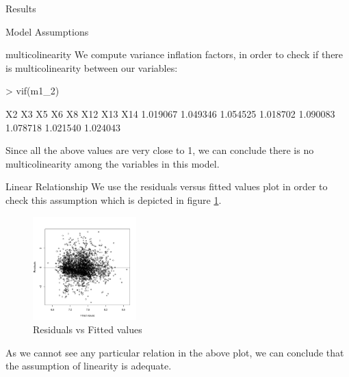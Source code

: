 \documentclass[a4paper,11pt]{article}
\begin{document}
\begin{section}{Results}
\begin{subsection}{Model Assumptions}
\begin{subsubsection}{multicolinearity}
We compute variance inflation factors, in order to check if there is multicolinearity between our variables:
\begin{Schunk}
\begin{Sinput}
> vif(m1_2)
\end{Sinput}
\begin{Soutput}
      X2       X3       X5       X6       X8      X12      X13      X14 
1.019067 1.049346 1.054525 1.018702 1.090083 1.078718 1.021540 1.024043 
\end{Soutput}
\end{Schunk}
Since all the above values are very close to 1, we can conclude there is no multicolinearity among the variables in this model.
\end{subsubsection}

\begin{subsubsection}{Linear Relationship}
We use the residuals versus fitted values plot in order to check this assumption which is depicted in figure \ref{lin-rel}.

\begin{figure}[h]
\includegraphics [width=4cm,height=4cm]{lin-rel}
\caption{Residuals vs Fitted values}
\label{lin-rel}
\end{figure}

As we cannot see any particular relation in the above plot, we can conclude that the assumption of linearity is adequate.
\end{subsubsection}

\end{subsection}



\end{section}
\end{document}
